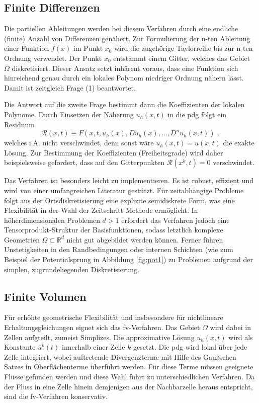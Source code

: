 \subsection{Finite Differenzen}\label{sec:FD}
Die partiellen Ableitungen werden bei diesem Verfahren durch eine endliche (finite) Anzahl von Differenzen genähert. Zur Formulierung der n-ten Ableitung einer Funktion $f(x)$ im Punkt $x_0$ wird die zugehörige Taylorreihe bis zur n-ten Ordnung verwendet. Der Punkt $x_0$ entstammt einem Gitter, welches das Gebiet $\Omega$ diskretisiert. Dieser Ansatz setzt inhärent voraus, dass eine Funktion sich hinreichend genau durch ein lokales Polynom niedriger Ordnung nähern lässt. Damit ist zeitgleich Frage (1) beantwortet.

Die Antwort auf die zweite Frage bestimmt dann die Koeffizienten der lokalen Polynome. Durch Einsetzen der Näherung $u_h(x,t)$ in die \ac{pdg} folgt ein Residuum
\begin{equation}
  \mathcal{R}(x,t)\equiv F(x,t, u_h(x), Du_h(x), \dots, D^nu_h(x,t)) \; ,
\end{equation}
welches i.A. nicht verschwindet, denn sonst wäre ${u_h(x,t) = u(x,t)}$ die exakte Lösung. Zur Bestimmung der Koeffizienten (Freiheitsgrade) wird daher beispielsweise gefordert, dass auf den Gitterpunkten ${\mathcal{R}(x^k,t)=0}$ verschwindet.

Das Verfahren ist besonders leicht zu implementieren. Es ist robust, effizient und wird von einer umfangreichen Literatur gestützt. Für zeitabhängige Probleme folgt aus der Ortsdiskretisierung eine explizite semidiskrete Form, was eine Flexibilität in der Wahl der Zeitschritt-Methode ermöglicht. In höherdimensionalen Problemen $d>1$ erfordert das Verfahren jedoch eine Tensorprodukt-Struktur der Basisfunktionen, sodass letztlich komplexe Geometrien $\Omega\subset{\mathbb{R}^d}$ nicht gut abgebildet werden können. Ferner führen Unstetigkeiten in den Randbedingungen oder internen Schichten (wie zum Beispiel der Potentialsprung in Abbildung \ref{fig:pot1}) zu Problemen aufgrund der simplen, zugrundeliegenden Diskretisierung.

\subsection{Finite Volumen}
Für erhöhte geometrische Flexibilität und insbesondere für nichtlineare Erhaltungsgleichungen eignet sich das \ac{fv}-Verfahren. Das Gebiet $\Omega$ wird dabei in Zellen aufgteilt, zumeist Simplizes. Die approximative Lösung $u_h(x,t)$ wird als Konstante $\bar{u}^k(t)$ innerhalb einer Zelle $k$ gesetzt. Die \ac{pdg} wird lokal über jede Zelle integriert, wobei auftretende Divergenzterme mit Hilfe des Gaußschen Satzes in Oberflächenterme überführt werden. Für diese Terme müssen geeignete Flüsse gefunden werden und diese Wahl führt zu unterschiedlichen Verfahren. Da der Fluss in eine Zelle hinein demjenigen aus der Nachbarzelle heraus entspricht, sind die \ac{fv}-Verfahren konservativ.

